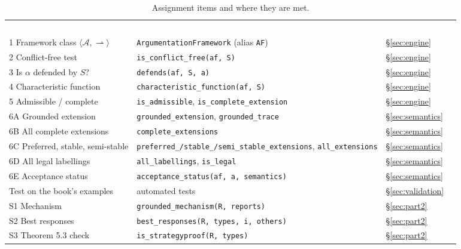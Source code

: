 \documentclass[10pt,a4paper]{article}
\newcommand{\thd}[1]{\textcolor{white}{\sffamily\bfseries #1}}
\newcommand{\yes}{\textcolor{good}{\ding{51}}}
\newcommand{\code}[1]{\textcolor{brand!85!black}{\texttt{#1}}}
\newcommand{\att}{\rightharpoonup}          %
\newcommand{\AF}{\langle\mathcal{A},\att\rangle}
\begin{document}
\begin{table}[H]\centering
\caption{Assignment items and where they are met.}\label{tab:req}
\small
\begin{tabularx}{\textwidth}{>{\raggedright\arraybackslash}X >{\raggedright\arraybackslash}p{7.0cm} >{\raggedright\arraybackslash}p{1.3cm} c}
\rowcolor{brand}\thd{Requirement} & \thd{Function} & \thd{Section} & \thd{}\\
\rowcolor{white} 1 Framework class $\AF$ & \code{ArgumentationFramework} (alias \code{AF}) & \S\ref{sec:engine} & \yes\\
\rowcolor{rowalt} 2 Conflict-free test & \code{is\_conflict\_free(af, S)} & \S\ref{sec:engine} & \yes\\
\rowcolor{white} 3 Is $\alpha$ defended by $S$? & \code{defends(af, S, a)} & \S\ref{sec:engine} & \yes\\
\rowcolor{rowalt} 4 Characteristic function & \code{characteristic\_function(af, S)} & \S\ref{sec:engine} & \yes\\
\rowcolor{white} 5 Admissible / complete & \code{is\_admissible}, \code{is\_complete\_extension} & \S\ref{sec:engine} & \yes\\
\rowcolor{rowalt} 6A Grounded extension & \code{grounded\_extension}, \code{grounded\_trace} & \S\ref{sec:semantics} & \yes\\
\rowcolor{white} 6B All complete extensions & \code{complete\_extensions} & \S\ref{sec:semantics} & \yes\\
\rowcolor{rowalt} 6C Preferred, stable, semi-stable & \code{preferred\_/stable\_/semi\_stable\_extensions}, \code{all\_extensions} & \S\ref{sec:semantics} & \yes\\
\rowcolor{white} 6D All legal labellings & \code{all\_labellings}, \code{is\_legal} & \S\ref{sec:semantics} & \yes\\
\rowcolor{rowalt} 6E Acceptance status & \code{acceptance\_status(af, a, semantics)} & \S\ref{sec:semantics} & \yes\\
\rowcolor{white} Test on the book's examples & 161 automated tests & \S\ref{sec:validation} & \yes\\
\rowcolor{rowalt} S1 Mechanism & \code{grounded\_mechanism(R, reports)} & \S\ref{sec:part2} & \yes\\
\rowcolor{white} S2 Best responses & \code{best\_responses(R, types, i, others)} & \S\ref{sec:part2} & \yes\\
\rowcolor{rowalt} S3 Theorem 5.3 check & \code{is\_strategyproof(R, types)} & \S\ref{sec:part2} & \yes\\

\end{tabularx}
\end{table}
\end{document}
